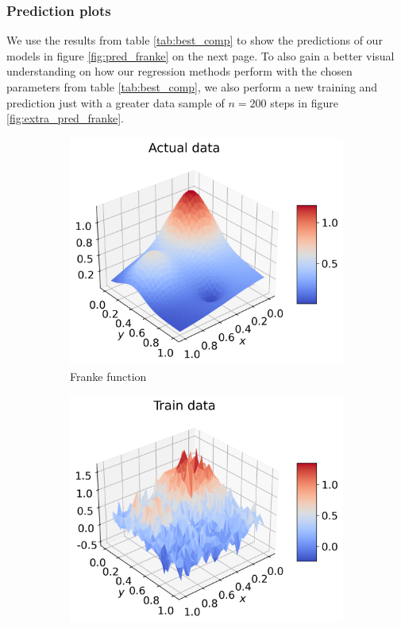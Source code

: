 \documentclass[12pt]{article}
\begin{document}
\subsubsection{Prediction plots}
We use the results from table \ref{tab:best_comp} to show the predictions of our models in figure \ref{fig:pred_franke} on the next page. To also gain a better visual understanding on how our regression methods perform with the chosen parameters from table \ref{tab:best_comp}, we also perform a new training and prediction just with a greater data sample of $n=200$ steps in figure \ref{fig:extra_pred_franke}.
\begin{figure}[H]
  \begin{subfigure}{.5\textwidth}
    \centering
    \includegraphics[width=\textwidth]{../figures/actual_data_franke_2.png}
    \caption{Franke function}
    \label{fig:pred_real}
  \end{subfigure}
  \begin{subfigure}{.5\textwidth}
    \centering
    \includegraphics[width=\textwidth]{../figures/train_data_franke_2.png}

\end{subfigure}
\end{figure}
\end{document}
